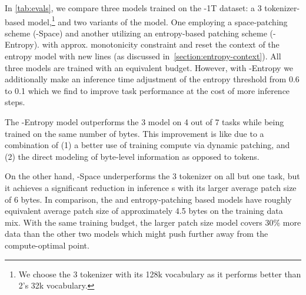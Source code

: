 \documentclass[]{fairmeta}
\begin{document}
In \autoref{tab:evals}, we compare three models trained on the \model{}-1T dataset: a \bpe{} \llama{} 3 tokenizer-based model,\footnote{We choose the \llama{} 3 tokenizer with its 128k vocabulary as it performs better than \llama{} 2's 32k vocabulary.} and two variants of the \model{} model. One employing a space-patching scheme (\model{}-Space) and another utilizing an entropy-based patching scheme (\model{}-Entropy). with approx. monotonicity constraint and reset the context of the entropy model with new lines (as discussed in~\autoref{section:entropy-context}). All three models are trained with an equivalent \flop{} budget. However, with \model{}-Entropy we additionally make an inference time adjustment of the entropy threshold from 0.6 to 0.1 which we find to improve task performance at the cost of more inference steps.

The \model{}-Entropy model outperforms the \llama{} 3 model on 4 out of 7 tasks while being trained on the same number of bytes. This improvement is like due to a combination of (1) a better use of training compute via dynamic patching, and (2) the direct modeling of byte-level information as opposed to tokens.

On the other hand, \model{}-Space underperforms the \llama{} 3 tokenizer on all but one task, but it achieves a significant reduction in inference \flop{}s with its larger average patch size of 6 bytes.
In comparison, the \bpe{} and entropy-patching based models have roughly equivalent average patch size of approximately 4.5 bytes on the training data mix. With the same training budget, the larger patch size model covers 30\% more data than the other two models which might push \model{} further away from the compute-optimal point.

\begin{table}[t]
    \centering
    \caption{Details of models used in the fixed-inference scaling study. We report non-embedding parameters for each model and their relative number compared to \llama{} 2. We pick model sizes with equal inference \flop{}s per byte. We also indicate BPE's compute-optimal training data quantity and the crossover point where \model{} surpasses BPE as seen in \autoref{fig:fixed_inference_scaling} (both expressed in bytes of training data). This point is achieved at much smaller scales compared to many modern training budgets.}
    \label{tab:fixed-inf-params}
\end{table}
\end{document}

